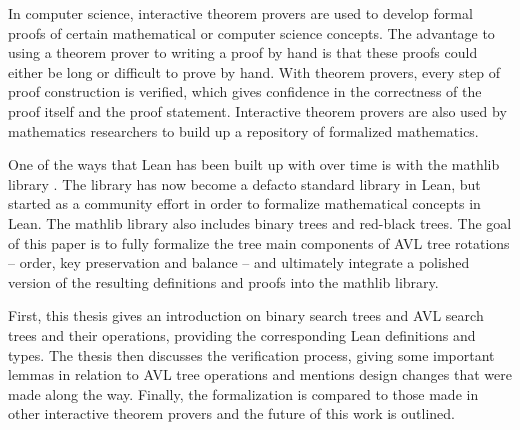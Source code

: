 In computer science, interactive theorem provers are used to develop formal proofs of certain mathematical or computer science concepts. The advantage to using a theorem prover to writing a proof by hand is that these proofs could either be long or difficult to prove by hand. With theorem provers, every step of proof construction is verified, which gives confidence in the correctness of the proof itself and the proof statement. Interactive theorem provers are also used by mathematics researchers to build up a repository of formalized mathematics. 

One of the ways that Lean has been built up with over time is with the mathlib library \cite{The_mathlib_Community_2020}. The library has now become a defacto standard library in Lean, but started as a community effort in order to formalize mathematical concepts in Lean. The mathlib library also includes binary trees and red-black trees. The goal of this paper is to fully formalize the tree main components of AVL tree rotations -- order, key preservation and balance -- and ultimately integrate a polished version of the resulting definitions and proofs into the mathlib library.

First, this thesis gives an introduction on binary search trees and AVL search trees and their operations, providing the corresponding Lean definitions and types. The thesis then discusses the verification process, giving some important lemmas in relation to AVL tree operations and mentions design changes that were made along the way. Finally, the formalization is compared to those made in other interactive theorem provers and the future of this work is outlined.